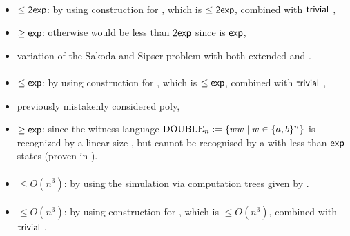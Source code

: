 \paragraph{\OMOLA{}\tto\OMODLA}
\begin{itemize}
	\item $\le\mathsf{2exp}$: by using construction for \hyperref[cost:OM1LAto1DFA]{\OMOLA{}\tto\ODFA}, which is $\le\mathsf{2exp}$, combined with $\mathsf{trivial}$ \ODFA{}\tto\OMODLA,
	\item $\ge\mathsf{exp}$: otherwise \hyperref[cost:OM1LAto1DFA]{\OMOLA{}\tto\ODFA} would be less than $\mathsf{2exp}$ since \hyperref[cost:OM1DLAto1DFA]{\OMODLA{}\tto\ODFA} is $\mathsf{exp}$,
	\item variation of the Sakoda and Sipser problem with both extended \TNFA and \TDFA.
\end{itemize}
\paragraph{\OMODLA{}\tto\ONFA}
\begin{itemize}
	\item $\le\mathsf{exp}$: by using construction for \hyperref[cost:OM1DLAto1DFA]{\OMODLA{}\tto\ODFA}, which is $\le\mathsf{exp}$, combined with $\mathsf{trivial}$ \ODFA{}\tto\ONFA,
	\item previously mistakenly considered poly,
	\item $\ge\mathsf{exp}$: since the witness language $\mathrm{DOUBLE}_n:=\{ww\mid w\in\{a,b\}^n\}$ is recognized by a linear size \OMODLA, but cannot be recognised by a \ONFA with less than $\mathsf{exp}$ states (proven in ).
\end{itemize}
\paragraph{\OMODLA{}\tto\TDFA}\label{cost:OM1DLAto2DFA}
\begin{itemize}
	\item $\le O(n^3)$: by using the simulation via computation trees given by .
\end{itemize}
\paragraph{\OMODLA{}\tto\TNFA}
\begin{itemize}
	\item $\le O(n^3)$: by using construction for \hyperref[cost:OM1DLAto2DFA]{\OMODLA{}\tto\TDFA}, which is $\le O(n^3)$, combined with $\mathsf{trivial}$ \TDFA{}\tto\TNFA.
\end{itemize}



